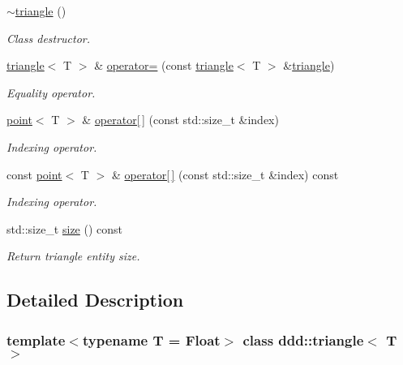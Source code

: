 \begin{DoxyCompactItemize}
\hyperlink{classddd_1_1triangle_ae17a51e842e44cfb3061bdca7e64bc11}{$\sim$triangle} ()
\begin{DoxyCompactList}\small\item\em Class destructor. \end{DoxyCompactList}\item 
\hyperlink{classddd_1_1triangle}{triangle}$<$ T $>$ \& \hyperlink{classddd_1_1triangle_a4bda6c1640652c41dff136e5b468789c}{operator=} (const \hyperlink{classddd_1_1triangle}{triangle}$<$ T $>$ \&\hyperlink{classddd_1_1triangle}{triangle})
\begin{DoxyCompactList}\small\item\em Equality operator. \end{DoxyCompactList}\item 
\hyperlink{classddd_1_1point}{point}$<$ T $>$ \& \hyperlink{classddd_1_1triangle_afa3078cf85103598c7967644de4d2dc1}{operator\mbox{[}$\,$\mbox{]}} (const std\+::size\+\_\+t \&index)
\begin{DoxyCompactList}\small\item\em Indexing operator. \end{DoxyCompactList}\item 
const \hyperlink{classddd_1_1point}{point}$<$ T $>$ \& \hyperlink{classddd_1_1triangle_aad15ef95a744f9177a0424c3c27afe72}{operator\mbox{[}$\,$\mbox{]}} (const std\+::size\+\_\+t \&index) const
\begin{DoxyCompactList}\small\item\em Indexing operator. \end{DoxyCompactList}\item 
\mbox{\label{classddd_1_1triangle_ae40fd95c96248e2b415858bee33a844e}} 
std\+::size\+\_\+t \hyperlink{classddd_1_1triangle_ae40fd95c96248e2b415858bee33a844e}{size} () const
\begin{DoxyCompactList}\small\item\em Return triangle entity size. \end{DoxyCompactList}\end{DoxyCompactItemize}


\subsection{Detailed Description}
\subsubsection*{template$<$typename T = Float$>$\newline
class ddd\+::triangle$<$ T $>$}

